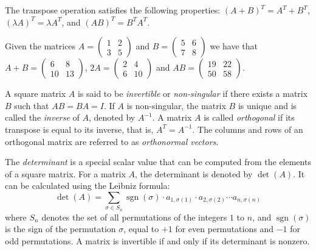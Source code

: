 The transpose operation satisfies the following properties: $(A + B)^T = A^T + B^T$, $(\lambda A)^T = \lambda A^T$, and $(AB)^T = B^T A^T$.

\begin{example}
Given the matrices $A = \left( \begin{smallmatrix} 1 & 2 \\ 3 & 5 \end{smallmatrix} \right)$ and $B = \left( \begin{smallmatrix} 5 & 6 \\ 7 & 8 \end{smallmatrix} \right)$ we have that $A + B = \left( \begin{smallmatrix} 6 & 8 \\ 10 & 13 \end{smallmatrix} \right)$, $2 A = \left( \begin{smallmatrix} 2 & 4 \\ 6 & 10 \end{smallmatrix} \right)$ and $A B = \left( \begin{smallmatrix} 19 & 22 \\ 50 & 58 \end{smallmatrix} \right)$.
\end{example}

A square matrix $A$ is said to be \emph{invertible} or \emph{non-singular} if there exists a matrix $B$ such that $AB = BA = I$. If $A$ is non-singular, the matrix $B$ is unique and is called the \emph{inverse} of $A$, denoted by $A^{-1}$. A matrix $A$ is called \emph{orthogonal} if its transpose is equal to its inverse, that is, $A^T = A^{-1}$. The columns and rows of an orthogonal matrix are referred to as \emph{orthonormal vectors}.

The \emph{determinant} is a special scalar value that can be computed from the elements of a square matrix. For a matrix $A$, the determinant is denoted by $\det(A)$. It can be calculated using the Leibniz formula:
\[
\det(A) = \sum_{\sigma \in S_n} \operatorname{sgn}(\sigma) \cdot a_{1,\sigma(1)} \cdot a_{2,\sigma(2)} \cdots a_{n,\sigma(n)}
\]
where $S_n$ denotes the set of all permutations of the integers $1$ to $n$, and $\operatorname{sgn}(\sigma)$ is the sign of the permutation $\sigma$, equal to $+1$ for even permutations and $-1$ for odd permutations. A matrix is invertible if and only if its determinant is nonzero.

